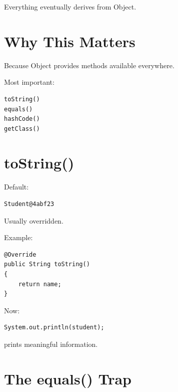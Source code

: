 \documentclass[11pt,a4paper]{book}
\begin{document}

Everything eventually derives from Object.


\section{Why This Matters}

Because Object provides methods
available everywhere.


Most important:

\begin{verbatim}
toString()
equals()
hashCode()
getClass()
\end{verbatim}


\section{toString()}

Default:

\begin{verbatim}
Student@4abf23
\end{verbatim}


Usually overridden.


Example:

\begin{verbatim}
@Override
public String toString()
{
    return name;
}
\end{verbatim}


Now:

\begin{verbatim}
System.out.println(student);
\end{verbatim}

prints meaningful information.


\section{The equals() Trap}
\end{document}
